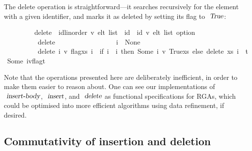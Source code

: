 The delete operation is straightforward---it searches recursively for the element with a given identifier, and marks it as deleted by setting its flag to $\isa{True}$:
\vspace{0.35em}
\begin{isabellebody}
\ \ \ \ \ \ \ \ \ delete\ {\isacharcolon}{\isacharcolon}\ {\isachardoublequoteopen}{\isacharparenleft}{\isacharprime}id{\isacharcolon}{\isacharcolon}{\isacharbraceleft}linorder{\isacharbraceright}{\isacharcomma}\ {\isacharprime}v{\isacharparenright}\ elt\ list\ {\isasymRightarrow}\ {\isacharprime}id\ {\isasymRightarrow}\ {\isacharparenleft}{\isacharprime}id{\isacharcomma}\ {\isacharprime}v{\isacharparenright}\ elt\ list\ option{\isachardoublequoteclose}\ \isanewline
\ \ \ \ \ \ \ \ \ \ {\isachardoublequoteopen}delete\ {\isacharbrackleft}{\isacharbrackright}\ \ \ \ \ \ \ \ \ \ \ \ \ \ \ \ \ i\ {\isacharequal}\ None{\isachardoublequoteclose}\ {\isacharbar}\isanewline
\ \ \ \ \ \ \ \ \ \ {\isachardoublequoteopen}delete\ {\isacharparenleft}{\isacharparenleft}i{\isacharprime}{\isacharcomma}\ v{\isacharcomma}\ flag{\isacharparenright}{\isacharhash}xs{\isacharparenright}\ i\ {\isacharequal}\ {\isacharparenleft}if\ i{\isacharprime}\ {\isacharequal}\ i\ then\ Some\ {\isacharparenleft}{\isacharparenleft}i{\isacharprime}{\isacharcomma}\ v{\isacharcomma}\ True{\isacharparenright}{\isacharhash}xs{\isacharparenright}\ else\ delete\ xs\ i\ {\isasymbind}\ {\isacharparenleft}{\isasymlambda}t{\isachardot}\ Some\ {\isacharparenleft}{\isacharparenleft}i{\isacharprime}{\isacharcomma}v{\isacharcomma}flag{\isacharparenright}{\isacharhash}t{\isacharparenright}{\isacharparenright}{\isacharparenright}{\isachardoublequoteclose}%
\end{isabellebody}
\vspace{0.35em}
Note that the operations presented here are deliberately inefficient, in order to make them easier to reason about.
One can see our implementations of $\isa{insert-body}$, $\isa{insert}$, and $\isa{delete}$ as functional specifications for RGAs, which could be optimised into more efficient algorithms using data refinement, if desired.

\subsection{Commutativity of insertion and deletion}

